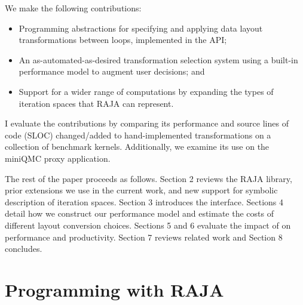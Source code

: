 We make the following contributions:
\begin{itemize}
\item Programming abstractions for specifying and applying data layout transformations between loops, implemented in the \FormatDecisions{} API\@;
\item An as-automated-as-desired transformation selection system using a built-in performance model to augment user decisions; and
\item Support for a wider range of computations by expanding the types of iteration spaces that RAJA can represent.
\end{itemize}
I evaluate the contributions by comparing its performance and source lines of code (SLOC) changed/added to hand-implemented transformations on a collection of benchmark kernels.
Additionally, we examine its use on the miniQMC proxy application.

The rest of the paper proceeds as follows. 
Section 2 reviews the RAJA library, prior extensions we use in the current work, and new support for symbolic description of iteration spaces.
Section 3 introduces the \FormatDecisions{} interface.
Sections 4 detail how we construct our performance model and estimate the costs of different layout conversion choices.
Sections 5 and 6 evaluate the impact of \FormatDecisions{}  on performance and productivity.
Section 7 reviews related work and Section 8 concludes.



\section{Programming with RAJA}\label{sec:kernelObjects}


